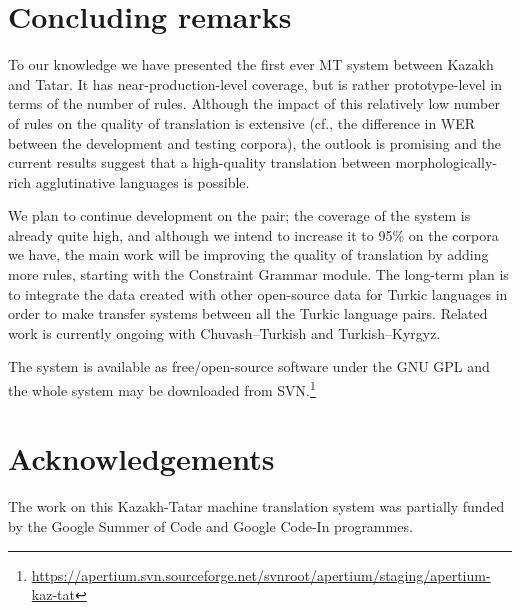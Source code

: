 \documentclass[a4paper,11pt]{article}
\begin{document}


\section{Concluding remarks}
\label{sec:conc}

To our knowledge we have presented the first ever MT system between Kazakh and Tatar. It has near-production-level
coverage, but is rather prototype-level in terms of the number of rules.  Although the impact of this relatively low number of rules on the
quality of translation is extensive (cf., the difference in WER between the development and testing corpora), the outlook is promising and the current results suggest
that a high-quality translation between morphologically-rich agglutinative languages is possible.

We plan to continue development on the pair; the coverage of the system is already quite high, and although we intend to
increase it to 95\% on the corpora we have, the main work will be improving the quality of translation by adding
more rules, starting with the Constraint Grammar module.
The long-term plan is to integrate the data created with other open-source data for Turkic languages in order to make
transfer systems between all the Turkic language pairs.  Related work is currently ongoing with Chuvash--Turkish and Turkish--Kyrgyz.

The system is available as free/open-source software under the GNU GPL and the whole system may be downloaded
from SVN.\footnote{\url{https://apertium.svn.sourceforge.net/svnroot/apertium/staging/apertium-kaz-tat}}

\section*{Acknowledgements}

The work on this Kazakh-Tatar machine translation system was partially funded by the Google Summer of Code and Google Code-In programmes.

%
%

%

\end{document}
